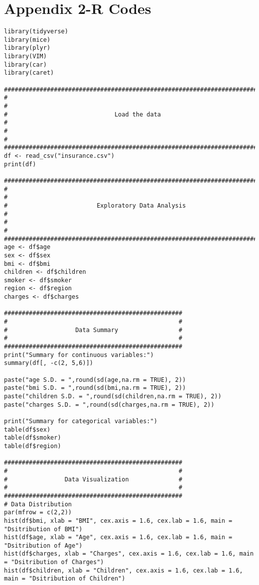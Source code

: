 \documentclass[12pt]{article}
\begin{document}
 
\newpage 
\section*{Appendix 2-R Codes}	

\ifprintCode
\begin{verbatim}
library(tidyverse)
library(mice)
library(plyr)
library(VIM)
library(car)
library(caret)

#######################################################################
#                                                                     #
#                              Load the data                          #
#                                                                     #
#######################################################################
df <- read_csv("insurance.csv")
print(df)

#######################################################################
#                                                                     #
#                         Exploratory Data Analysis                   #
#                                                                     #
#######################################################################
age <- df$age
sex <- df$sex
bmi <- df$bmi
children <- df$children
smoker <- df$smoker
region <- df$region
charges <- df$charges

##################################################
#                                                #
#                   Data Summary                 #
#                                                #
##################################################
print("Summary for continuous variables:")
summary(df[, -c(2, 5,6)])

paste("age S.D. = ",round(sd(age,na.rm = TRUE), 2))
paste("bmi S.D. = ",round(sd(bmi,na.rm = TRUE), 2))
paste("children S.D. = ",round(sd(children,na.rm = TRUE), 2))
paste("charges S.D. = ",round(sd(charges,na.rm = TRUE), 2))

print("Summary for categorical variables:")
table(df$sex)
table(df$smoker)
table(df$region)

##################################################
#                                                #
#                Data Visualization              #
#                                                #
##################################################
# Data Distribution
par(mfrow = c(2,2))
hist(df$bmi, xlab = "BMI", cex.axis = 1.6, cex.lab = 1.6, main = "Dsitribution of BMI")
hist(df$age, xlab = "Age", cex.axis = 1.6, cex.lab = 1.6, main = "Dsitribution of Age")
hist(df$charges, xlab = "Charges", cex.axis = 1.6, cex.lab = 1.6, main = "Dsitribution of Charges")
hist(df$children, xlab = "Children", cex.axis = 1.6, cex.lab = 1.6, main = "Dsitribution of Children")


\end{verbatim}
\end{document}
